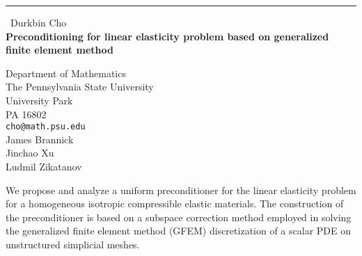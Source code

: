 \documentclass{report}
\begin{document}
\begin{center}
\rule{6in}{1pt} \
{\large Durkbin Cho \\
{\bf Preconditioning for linear elasticity problem based on generalized finite element method}}

Department of Mathematics \\ The Pennsylvania State University \\ University Park \\ PA 16802
\\
{\tt cho@math.psu.edu}\\
James Brannick\\
Jinchao Xu\\
	Ludmil Zikatanov\end{center}

We propose and analyze a uniform preconditioner for the linear
elasticity problem for a homogeneous isotropic compressible elastic
materials. The construction of the preconditioner is based on a subspace
correction method employed in solving the
generalized finite element method (GFEM) discretization of a scalar PDE
on unstructured simplicial meshes.
\end{document}
